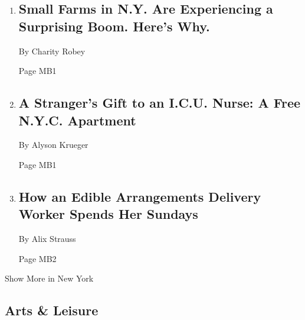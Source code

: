 \begin{enumerate}
\def\labelenumi{\arabic{enumi}.}
\item
  \href{/2020/05/08/nyregion/small-farms-ny-coronavirus.html}{}

  \hypertarget{small-farms-in-ny-are-experiencing-a-surprising-boom-heres-why}{%
  \subsection{Small Farms in N.Y. Are Experiencing a Surprising Boom.
  Here's
  Why.}\label{small-farms-in-ny-are-experiencing-a-surprising-boom-heres-why}}

  By Charity Robey

  Page MB1
\item
  \href{/2020/05/08/nyregion/coronavirus-apartment-donations-nyc.html}{}

  \hypertarget{a-strangers-gift-to-an-icu-nurse-a-free-nyc-apartment}{%
  \subsection{A Stranger's Gift to an I.C.U. Nurse: A Free N.Y.C.
  Apartment}\label{a-strangers-gift-to-an-icu-nurse-a-free-nyc-apartment}}

  By Alyson Krueger

  Page MB1
\item
  \href{/2020/05/08/nyregion/coronavirus-edible-arrangements-nyc.html}{}

  \hypertarget{how-an-edible-arrangements-delivery-worker-spends-her-sundays}{%
  \subsection{How an Edible Arrangements Delivery Worker Spends Her
  Sundays}\label{how-an-edible-arrangements-delivery-worker-spends-her-sundays}}

  By Alix Strauss

  Page MB2
\end{enumerate}

Show More in New York

\hypertarget{arts--leisure}{%
\subsection{Arts \& Leisure}\label{arts--leisure}}

